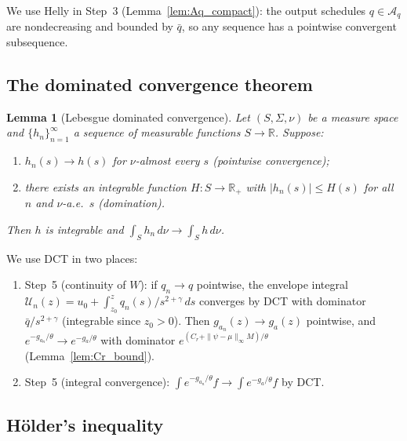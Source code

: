 \documentclass[12pt,a4paper]{article}
\theoremstyle{definition}
\theoremstyle{plain}
\newtheorem{lemma}{Lemma}[section]
\theoremstyle{remark}
\newcommand{\R}{\mathbb{R}}
\newcommand{\zlow}{z_{\scriptscriptstyle 0}}
\newcommand{\calU}{\mathcal{U}}
\newcommand{\calA}{\mathcal{A}}
\begin{document}
We use Helly in Step~3 (Lemma~\ref{lem:Aq_compact}):
the output schedules $q \in \calA_q$ are nondecreasing
and bounded by $\bar q$, so any sequence has a
pointwise convergent subsequence.


\subsection{The dominated convergence theorem}

\begin{lemma}[Lebesgue dominated convergence]
\label{lem:DCT}
Let $(S, \Sigma, \nu)$ be a measure space and
$\{h_n\}_{n=1}^\infty$ a sequence of measurable functions
$S \to \R$.  Suppose:
\begin{enumerate}[label=(\roman*)]
\item $h_n(s) \to h(s)$ for $\nu$-almost every $s$
  (pointwise convergence);
\item there exists an integrable function $H: S \to \R_+$
  with $|h_n(s)| \leq H(s)$ for all $n$ and $\nu$-a.e.\
  $s$ (domination).
\end{enumerate}
Then $h$ is integrable and
$\int_S h_n\,d\nu \to \int_S h\,d\nu$.
\end{lemma}

We use DCT in two places:
\begin{enumerate}[label=(\alph*)]
\item Step~5 (continuity of $W$): if $q_n \to q$
  pointwise, the envelope integral
  $\calU_n(z) = u_0 +
  \int_{\zlow}^z q_n(s)/s^{2+\gamma}\,ds$ converges by
  DCT with dominator $\bar q/s^{2+\gamma}$
  (integrable since $\zlow > 0$).  Then
  $g_{a_n}(z) \to g_a(z)$ pointwise, and
  $e^{-g_{a_n}/\theta} \to e^{-g_a/\theta}$ with
  dominator $e^{(C_r + \|\psi-\mu\|_\infty M)/\theta}$
  (Lemma~\ref{lem:Cr_bound}).
\item Step~5 (integral convergence):
  $\int e^{-g_{a_n}/\theta}f \to
  \int e^{-g_a/\theta}f$ by DCT.
\end{enumerate}


\subsection{H\"{o}lder's inequality}
\end{document}

